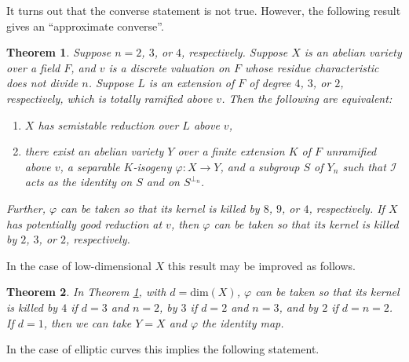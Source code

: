 \documentclass{amsart}
\def\I{{\mathcal I}}
\def\dim{\mathrm{dim}}
\newtheorem{thm}{Theorem}[section]
\theoremstyle{definition}
\begin{document}
It turns out that the converse statement is not true. 
However, the following result gives an ``approximate converse''.

\begin{thm}
\label{bothways}
Suppose $n = 2$, $3$, or $4$, respectively. Suppose  
$X$ is an abelian variety over a field $F$, and 
$v$ is a discrete valuation on $F$ whose residue characteristic 
does not divide $n$. 
Suppose
$L$ is an extension of $F$ of degree $4$, $3$, or
$2$, respectively, which 
is totally ramified above $v$. 
Then the following are equivalent:
\begin{enumerate}
\item[(i)] $X$ has semistable reduction over $L$ above $v$,
\item[(ii)] there exist an abelian variety $Y$ over a finite
extension $K$ of $F$ unramified above $v$, a separable
$K$-isogeny $\varphi : X \to Y$, 
and a subgroup 
$S$ of $Y_n$ such that 
$\I$ acts as the identity on $S$ and 
on $S^{\perp_n}$.
\end{enumerate}
Further, $\varphi$ can be taken so that
its kernel is killed by $8$, $9$, or $4$, respectively.
If $X$ has potentially good reduction at $v$, then $\varphi$ 
can be taken so that its kernel is killed by $2$, $3$, or
$2$, respectively.
\end{thm}

In the case of low-dimensional $X$ this result may be improved as follows.

\begin{thm}
\label{ellcor}
In Theorem \ref{bothways},
with $d = \dim(X)$, 
$\varphi$ can be taken so that its kernel is killed
by $4$ if $d = 3$ and $n = 2$,
by $3$ if $d =2$ and $n = 3$, and 
by $2$ if $d = n = 2$. If $d = 1$, then we can take
$Y = X$ and $\varphi$ the identity map.
\end{thm}

In the case of elliptic curves this implies the following statement.
\end{document}
